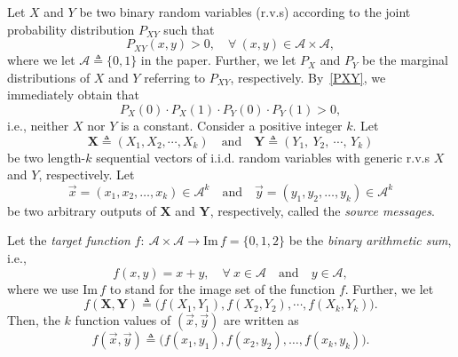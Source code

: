 \documentclass[11pt,draftclsnofoot,onecolumn]{IEEEtran}
\def\Im{\mathrm{Im}}
\begin{document}
Let $X$ and $Y$ be two binary random  variables (r.v.s) according to the joint probability distribution $P_{XY}$
such that
\begin{equation}\label{PXY}
P_{XY}(x,y)>0,\quad \forall~(x,y)\in\mathcal{A}\times\mathcal{A},
\end{equation}
where we let $\mathcal{A}\triangleq\{0,1\}$ in the paper.
Further, we let $P_{X}$ and $P_{Y}$ be the marginal distributions of $X$ and $Y$ referring to $P_{XY}$,
respectively. By~\eqref{PXY}, we immediately obtain that
\begin{equation*}
P_{X}(0)\cdot P_{X}(1)\cdot P_{Y}(0)\cdot P_{Y}(1)>0,
 \end{equation*}
 i.e., neither $X$ nor $Y$ is a constant.
Consider a positive integer $k$. Let
\begin{equation*}
\boldsymbol{X} \triangleq (X_{1}, X_{2}, \cdots, X_{k})\quad \text{and} \quad\boldsymbol{Y}\triangleq (Y_{1},~Y_{2},~\cdots,\, Y_{k})
\end{equation*}
be two length-$k$ sequential vectors of i.i.d. random variables with generic r.v.s $X$ and $Y$, respectively.
Let
\begin{equation*}
\vec{x}=(x_{1},x_{2},\dots, x_{k})\in\mathcal{A}^k\quad \text{and}\quad\vec{y}=(y_{1},y_{2},\dots,y_{k})\in\mathcal{A}^k
\end{equation*}
be two arbitrary outputs of $\boldsymbol{X}$ and $\boldsymbol{Y}$, respectively,  called the \emph{source messages}.

 Let the  \emph{target function} $f:~\mathcal{A}\times\mathcal{A}\to\Im\,f=\{0,1,2\}$  be the  \emph{binary arithmetic sum}, i.e.,
 \begin{equation*}
f(x,y)=x+y,\quad \forall~x\in\mathcal{A}\quad\text{and}\quad y\in\mathcal{A},
\end{equation*}
where we use $\Im\,f$ to stand for the image set of the function $f$.
Further, we let
\begin{equation*}
f(\boldsymbol{X},\boldsymbol{Y})\triangleq\big(f(X_1,Y_1),f(X_2,Y_2),\cdots,f(X_k,Y_k)\big).
\end{equation*}
Then, the $k$ function values of  $(\vec{x},\vec{y})$ are written as
\begin{equation*}
f(\vec{x},\vec{y})\triangleq\big(f(x_{1},y_{1}),f(x_{2},y_{2}),\dots ,f(x_{k},y_{k})\big).
\end{equation*}
\end{document}
